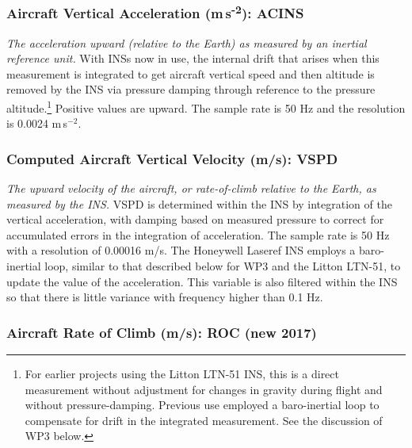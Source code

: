 \documentclass[
]{book}
\begin{document}
\hypertarget{ACINS}{%
\subsubsection*{\texorpdfstring{Aircraft Vertical Acceleration (m s\textsuperscript{-2}): ACINS}{Aircraft Vertical Acceleration (m s-2): ACINS}}\label{ACINS}}

\emph{The acceleration upward (relative to the Earth) as measured by an inertial reference unit.} With INSs now in use, the internal drift that arises when this measurement is integrated to get aircraft vertical speed and then altitude is removed by the INS via pressure damping through reference to the pressure altitude.\footnote{For earlier projects using the Litton LTN-51 INS, this is a direct measurement without adjustment for changes in gravity during flight and without pressure-damping. Previous use employed a baro-inertial loop to compensate for drift in the integrated measurement. See the discussion of WP3 below.}
Positive values are upward. The sample rate is 50 Hz and the resolution is 0.0024 m s\(^{-2}\).

\hypertarget{vspd}{%
\subsubsection*{Computed Aircraft Vertical Velocity (m/s): VSPD}\label{vspd}}

\emph{The upward velocity of the aircraft, or rate-of-climb relative to the Earth, as measured by the INS.} VSPD is determined within the INS by integration of the vertical acceleration, with damping based on measured pressure to correct for accumulated errors in the integration of acceleration. The sample rate is 50 Hz with a resolution of 0.00016 m/s. The Honeywell Laseref INS employs a baro-inertial loop, similar to that described below for WP3 and the Litton LTN-51, to update the value of the acceleration. This variable is also filtered within the INS so that there is little variance with frequency higher than 0.1 Hz.

\hypertarget{roc}{%
\subsubsection*{Aircraft Rate of Climb (m/s): ROC (new 2017)}\label{roc}}
\end{document}
